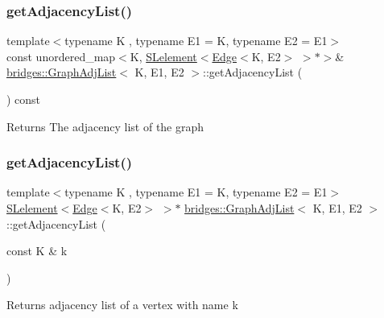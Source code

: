 \subsubsection{\texorpdfstring{get\+Adjacency\+List()}{getAdjacencyList()}\hspace{0.1cm}{\footnotesize\ttfamily [1/2]}}
{\footnotesize\ttfamily template$<$typename K , typename E1  = K, typename E2  = E1$>$ \\
const unordered\+\_\+map$<$K, \mbox{\hyperlink{classbridges_1_1_s_lelement}{S\+Lelement}}$<$\mbox{\hyperlink{classbridges_1_1_edge}{Edge}}$<$K, E2$>$ $>$$\ast$$>$\& \mbox{\hyperlink{classbridges_1_1_graph_adj_list}{bridges\+::\+Graph\+Adj\+List}}$<$ K, E1, E2 $>$\+::get\+Adjacency\+List (\begin{DoxyParamCaption}{ }\end{DoxyParamCaption}) const\hspace{0.3cm}{\ttfamily [inline]}}

\begin{DoxyReturn}{Returns}
The adjacency list of the graph 
\end{DoxyReturn}
\mbox{\label{classbridges_1_1_graph_adj_list_ab9eb791b7c242742ac832121f297acdc}} 
\subsubsection{\texorpdfstring{get\+Adjacency\+List()}{getAdjacencyList()}\hspace{0.1cm}{\footnotesize\ttfamily [2/2]}}
{\footnotesize\ttfamily template$<$typename K , typename E1  = K, typename E2  = E1$>$ \\
\mbox{\hyperlink{classbridges_1_1_s_lelement}{S\+Lelement}}$<$\mbox{\hyperlink{classbridges_1_1_edge}{Edge}}$<$K, E2$>$ $>$$\ast$ \mbox{\hyperlink{classbridges_1_1_graph_adj_list}{bridges\+::\+Graph\+Adj\+List}}$<$ K, E1, E2 $>$\+::get\+Adjacency\+List (\begin{DoxyParamCaption}\item[{const K \&}]{k }\end{DoxyParamCaption})\hspace{0.3cm}{\ttfamily [inline]}}

Returns adjacency list of a vertex with name k


